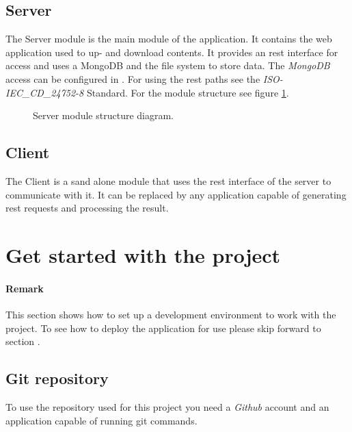 \documentclass[10pt]{article}
\begin{document}
\subsection{Server}
\label{subsec:server}
The Server module is the main module of the application. It contains the web application used to up- and download contents. It provides an rest interface for access and uses a MongoDB and the file system to store data. The \emph{MongoDB} access can be configured in . For using the rest paths see the \emph{ISO-IEC\_CD\_24752-8} Standard. For the module structure see figure \ref{fig:serveruml}.
\begin{figure}[b]
\centering
{}
\caption{Server module structure diagram.}
\label{fig:serveruml}
\end{figure}
\subsection{Client}
The Client is a sand alone module that uses the rest interface of the server to communicate with it. It can be replaced by any application capable of generating rest requests and processing the result.
\section{Get started with the project}
\paragraph{Remark} This section shows how to set up a development environment to work with the project. To see how to deploy the application for use please skip forward to section .
\subsection{Git repository}
To use the repository used for this project you need a \emph{Github} account and an application capable of running git commands.
\end{document}
